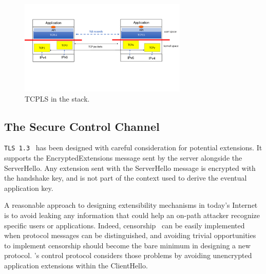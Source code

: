
\begin{figure}[!t]
  \begin{center}
      \vspace{-1.5cm}
    \includegraphics[width=8cm]{figures/tcpls-fig2.pdf}
  \end{center}
  \vspace{-1.5cm}
  \caption{TCPLS in the stack.}
  \label{fig:arch}
    \vspace{-0.5cm}
\end{figure}



\subsection{The Secure Control Channel}\label{sec:extending}

\texttt{TLS 1.3}~\cite{rfc8446} has been designed with careful consideration for
potential extensions. It supports the EncryptedExtensions message sent by the
server alongside the ServerHello. Any extension sent with the ServerHello
message is
encrypted with the handshake key, and is not part of the context used
to derive the eventual application key.

A reasonable approach to designing extensibility mechanisms in today's
Internet is to avoid leaking any information that could help an
on-path attacker recognize specific users or applications.
Indeed, censorship~\cite{Morshed2017a, Gosain2017a,Chai2019a} can be easily implemented when protocol messages
can be distinguished, and avoiding trivial
opportunities to implement censorship should become the bare minimum in
designing a new protocol. \tcpls's control protocol considers those problems by
avoiding unencrypted application extensions within the ClientHello.

